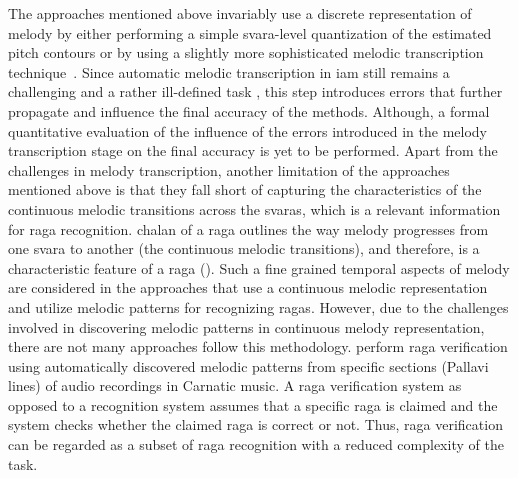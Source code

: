 The approaches mentioned above invariably use a discrete representation of melody by either performing a simple \gls{svara}-level quantization of the estimated pitch contours or by using a slightly more sophisticated melodic transcription technique~\cite{pandey2003tansen}. Since automatic melodic transcription in \gls{iam} still remains a challenging and a rather ill-defined task , this step introduces errors that further propagate and influence the final accuracy of the methods. Although, a formal quantitative evaluation of the influence of the errors introduced in the melody transcription stage on the final accuracy is yet to be performed. Apart from the challenges in melody transcription, another limitation of the approaches mentioned above is that they fall short of capturing the characteristics  of  the continuous melodic transitions across the \glspl{svara}, which is a relevant information for \gls{raga} recognition. \Gls{chalan} of a \gls{raga} outlines the way melody progresses from one \gls{svara} to another (the continuous melodic transitions), and therefore, is a characteristic feature of a \gls{raga} (). Such a fine grained temporal aspects of melody are considered in the approaches that use a continuous melodic representation and utilize melodic patterns for recognizing \glspl{raga}. However, due to the challenges involved in discovering melodic patterns in continuous melody representation, there are not many approaches follow this methodology. \cite{shrey_ISMIR_2015} perform \gls{raga} verification using automatically discovered melodic patterns from specific sections (Pallavi lines) of audio recordings in Carnatic music. A \gls{raga} verification system as opposed to a recognition system assumes that a specific \gls{raga} is claimed and the system checks whether the claimed \gls{raga} is correct or not. Thus, \gls{raga} verification can be regarded as a subset of \gls{raga} recognition with a reduced complexity of the task. 

